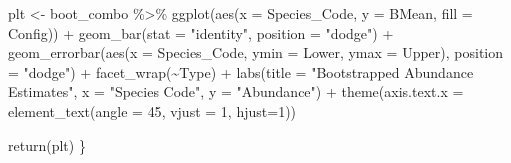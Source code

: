 \documentclass[
]{article}
\newenvironment{Shaded}{\begin{snugshade}}{\end{snugshade}}
\newcommand{\AttributeTok}[1]{\textcolor[rgb]{0.77,0.63,0.00}{#1}}
\newcommand{\DecValTok}[1]{\textcolor[rgb]{0.00,0.00,0.81}{#1}}
\newcommand{\FunctionTok}[1]{\textcolor[rgb]{0.00,0.00,0.00}{#1}}
\newcommand{\NormalTok}[1]{#1}
\newcommand{\OtherTok}[1]{\textcolor[rgb]{0.56,0.35,0.01}{#1}}
\newcommand{\SpecialCharTok}[1]{\textcolor[rgb]{0.00,0.00,0.00}{#1}}
\newcommand{\StringTok}[1]{\textcolor[rgb]{0.31,0.60,0.02}{#1}}
\begin{document}
\begin{Shaded}
\begin{Highlighting}[]
\NormalTok{  plt }\OtherTok{\textless{}{-}}\NormalTok{ boot\_combo }\SpecialCharTok{\%\textgreater{}\%}
          \FunctionTok{ggplot}\NormalTok{(}\FunctionTok{aes}\NormalTok{(}\AttributeTok{x =}\NormalTok{ Species\_Code, }\AttributeTok{y =}\NormalTok{ BMean, }\AttributeTok{fill =}\NormalTok{ Config)) }\SpecialCharTok{+}
          \FunctionTok{geom\_bar}\NormalTok{(}\AttributeTok{stat =} \StringTok{"identity"}\NormalTok{, }\AttributeTok{position =} \StringTok{"dodge"}\NormalTok{) }\SpecialCharTok{+}
          \FunctionTok{geom\_errorbar}\NormalTok{(}\FunctionTok{aes}\NormalTok{(}\AttributeTok{x =}\NormalTok{ Species\_Code, }\AttributeTok{ymin =}\NormalTok{ Lower, }\AttributeTok{ymax =}\NormalTok{ Upper), }\AttributeTok{position =} \StringTok{"dodge"}\NormalTok{) }\SpecialCharTok{+}
          \FunctionTok{facet\_wrap}\NormalTok{(}\SpecialCharTok{\textasciitilde{}}\NormalTok{Type) }\SpecialCharTok{+}
          \FunctionTok{labs}\NormalTok{(}\AttributeTok{title =} \StringTok{"Bootstrapped Abundance Estimates"}\NormalTok{,}
               \AttributeTok{x =} \StringTok{"Species Code"}\NormalTok{,}
               \AttributeTok{y =} \StringTok{"Abundance"}\NormalTok{) }\SpecialCharTok{+}
          \FunctionTok{theme}\NormalTok{(}\AttributeTok{axis.text.x =} \FunctionTok{element\_text}\NormalTok{(}\AttributeTok{angle =} \DecValTok{45}\NormalTok{, }\AttributeTok{vjust =} \DecValTok{1}\NormalTok{, }\AttributeTok{hjust=}\DecValTok{1}\NormalTok{)) }
  
  \FunctionTok{return}\NormalTok{(plt)}
\NormalTok{\}}


\end{Highlighting}
\end{Shaded}
\end{document}

